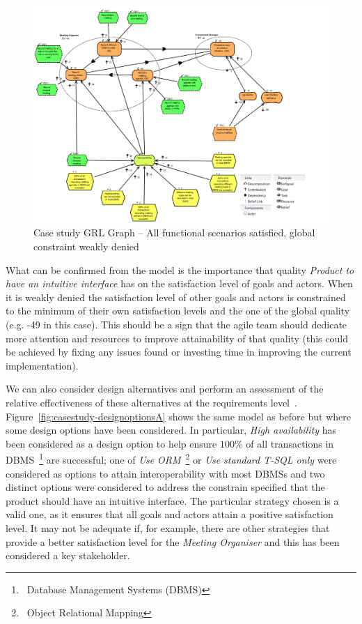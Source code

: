 \documentclass[dissertation,final]{softeng}
\begin{document}
\begin{figure}
\includegraphics[width=\columnwidth]{casestudy-functionalscenarios-globalconstraint-denied}
\centering
\caption{Case study GRL Graph -- All functional scenarios satisfied, global constraint weakly denied}
\label{fig:casestudy-functionalscenarios-globalconstraint-denied}
\end{figure} 

What can be confirmed from the model is the importance that quality \emph{Product to have an intuitive interface} has on the satisfaction level of goals and actors. When it is weakly denied the satisfaction level of other goals and actors is constrained to the minimum of their own satisfaction levels and the one of the global quality (e.g. -49 in this case). This should be a sign that the agile team should dedicate more attention and resources to improve attainability of that quality (this could be achieved by fixing any issues found or investing time in improving the current implementation).

We can also consider design alternatives and perform an assessment of the relative effectiveness of these alternatives at the requirements level~\citep{Amyot2010}. Figure~\ref{fig:casestudy-designoptionsA} shows the same model as before but where some design options have been considered. In particular, \emph{High availability} has been considered as a design option to help ensure $100\%$ of all transactions in DBMS~\footnote{~Database Management Systems (DBMS)} are successful; one of \emph{Use ORM}~\footnote{~Object Relational Mapping} or \emph{Use standard T-SQL only} were considered as options to attain interoperability with most DBMSs and two distinct options were considered to address the constrain specified that the product should have an intuitive interface. The particular strategy chosen is a valid one, as it ensures that all goals and actors attain a positive satisfaction level. It may not be adequate if, for example, there are other strategies that provide a better satisfaction level for the \emph{Meeting Organiser} and this has been considered a key stakeholder.
\end{document}
